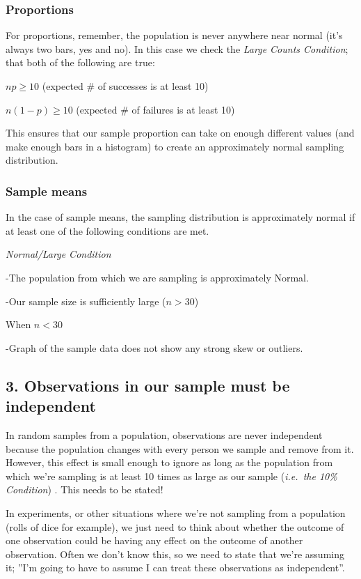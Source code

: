 \documentclass[
]{book}
\begin{document}
\hypertarget{proportions}{%
\subsubsection*{Proportions}\label{proportions}}

For proportions, remember, the population is never anywhere near normal (it's always two bars, yes and no). In this case we check the \emph{Large Counts Condition}; that both of the following are true:

\(np ≥ 10\) (expected \# of successes is at least 10)

\(n(1-p) ≥ 10\) (expected \# of failures is at least 10)

This ensures that our sample proportion can take on enough different values (and make enough bars in a histogram) to create an approximately normal sampling distribution.

\hypertarget{sample-means}{%
\subsubsection*{Sample means}\label{sample-means}}

In the case of sample means, the sampling distribution is approximately normal if at least one of the following conditions are met.

\emph{Normal/Large Condition}

-The population from which we are sampling is approximately Normal.

-Our sample size is sufficiently large (\(n > 30\))

When \(n<30\)

-Graph of the sample data does not show any strong skew or outliers.

\hypertarget{observations-in-our-sample-must-be-independent}{%
\subsection*{3. Observations in our sample must be independent}\label{observations-in-our-sample-must-be-independent}}

In random samples from a population, observations are never independent because the population changes with every person we sample and remove from it. However, this effect is small enough to ignore as long as the population from which we're sampling is at least 10 times as large as our sample (\emph{i.e.~the 10\% Condition}) . This needs to be stated!

In experiments, or other situations where we're not sampling from a population (rolls of dice for example), we just need to think about whether the outcome of one observation could be having any effect on the outcome of another observation. Often we don't know this, so we need to state that we're assuming it; ''I'm going to have to assume I can treat these observations as independent''.
\end{document}

